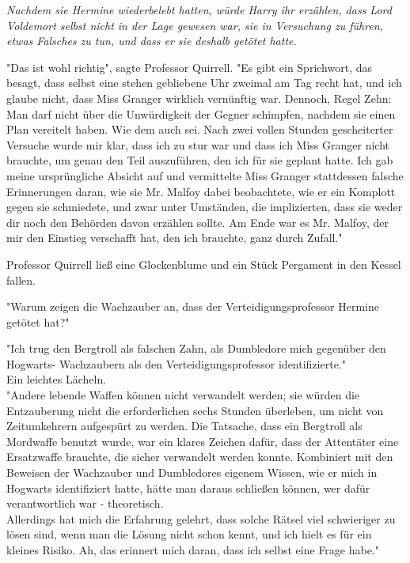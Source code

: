 {\emph{Nachdem sie Hermine wiederbelebt hatten, würde Harry ihr erzählen, dass Lord Voldemort selbst nicht in der Lage gewesen war, sie in Versuchung zu führen, etwas Falsches zu tun, und dass er sie deshalb getötet hatte.}

"Das ist wohl richtig", sagte Professor Quirrell. "Es gibt ein Sprichwort, das besagt, dass selbst eine stehen gebliebene Uhr zweimal am Tag recht hat, und ich glaube nicht, dass Miss Granger wirklich vernünftig war. Dennoch, Regel Zehn: Man darf nicht über die Unwürdigkeit der Gegner schimpfen, nachdem sie einen Plan vereitelt haben. Wie dem auch sei. Nach zwei vollen Stunden gescheiterter Versuche wurde mir klar, dass ich zu stur war und dass ich Miss Granger nicht brauchte, um genau den Teil auszuführen, den ich für sie geplant hatte. Ich gab meine ursprüngliche Absicht auf und vermittelte Miss Granger stattdessen falsche Erinnerungen daran, wie sie Mr. Malfoy dabei beobachtete, wie er ein Komplott gegen sie schmiedete, und zwar unter Umständen, die implizierten, dass sie weder dir noch den Behörden davon erzählen sollte. Am Ende war es Mr. Malfoy, der mir den Einstieg verschafft hat, den ich brauchte, ganz durch Zufall."

Professor Quirrell ließ eine Glockenblume und ein Stück Pergament in den Kessel fallen.

"Warum zeigen die Wachzauber an, dass der Verteidigungsprofessor Hermine getötet hat?"

"Ich trug den Bergtroll als falschen Zahn, als Dumbledore mich gegenüber den Hogwarts- Wachzaubern als den Verteidigungsprofessor identifizierte."\\ Ein leichtes Lächeln.\\ "Andere lebende Waffen können nicht verwandelt werden; sie würden die Entzauberung nicht die erforderlichen sechs Stunden überleben, um nicht von Zeitumkehrern aufgespürt zu werden. Die Tatsache, dass ein Bergtroll als Mordwaffe benutzt wurde, war ein klares Zeichen dafür, dass der Attentäter eine Ersatzwaffe brauchte, die sicher verwandelt werden konnte. Kombiniert mit den Beweisen der Wachzauber und Dumbledores eigenem Wissen, wie er mich in Hogwarts identifiziert hatte, hätte man daraus schließen können, wer dafür verantwortlich war - theoretisch.\\ Allerdings hat mich die Erfahrung gelehrt, dass solche Rätsel viel schwieriger zu lösen sind, wenn man die Lösung nicht schon kennt, und ich hielt es für ein kleines Risiko. Ah, das erinnert mich daran, dass ich selbst eine Frage habe."

}
